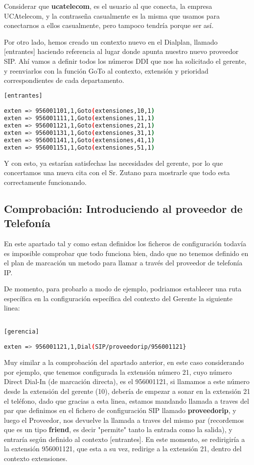 Considerar que \textbf{ucatelecom}, es el usuario al que conecta, la empresa UCAtelecom, y la contraseña casualmente es la misma que usamos para conectarnos a ellos casualmente, pero tampoco tendría porque ser así.

Por otro lado, hemos creado un contexto nuevo en el Dialplan, llamado [entrantes] haciendo referencia al lugar donde apunta nuestro nuevo proveedor SIP. Ahí vamos a definir todos los números DDI que nos ha solicitado el gerente, y reenviarlos con la función GoTo al contexto, extensión y prioridad correspondientes de cada departamento.

\begin{lstlisting}[language=bash,title={/etc/asterisk/extensions.conf}]
[entrantes]

exten => 956001101,1,Goto(extensiones,10,1)
exten => 956001111,1,Goto(extensiones,11,1)
exten => 956001121,1,Goto(extensiones,21,1)
exten => 956001131,1,Goto(extensiones,31,1)
exten => 956001141,1,Goto(extensiones,41,1)
exten => 956001151,1,Goto(extensiones,51,1)
\end{lstlisting}

Y con esto, ya estarían satisfechas las necesidades del gerente, por lo que concertamos una nueva cita con el Sr. Zutano para mostrarle que todo esta correctamente funcionando.

\subsection{Comprobación: Introduciendo al proveedor de Telefonía}

En este apartado tal y como estan definidos los ficheros de configuración todavía es imposible comprobar que todo funciona bien, dado que no tenemos definido en el plan de marcación un metodo para llamar a través del proveedor de telefonía IP. 

De momento, para probarlo a modo de ejemplo, podriamos establecer una ruta específica en la configuración específica del contexto del Gerente la siguiente linea:

\begin{lstlisting}[language=bash,title={/etc/asterisk/extensions.conf}]

[gerencia]

exten => 956001121,1,Dial(SIP/proveedorip/956001121}

\end{lstlisting}

Muy similar a la comprobación del apartado anterior, en este caso considerando por ejemplo, que tenemos configurada la extensión número 21, cuyo número Direct Dial-In (de marcación directa), es el 956001121, si llamamos a este número desde la extensión del gerente (10), debería de empezar a sonar en la extensión 21 el teléfono, dado que gracias a esta linea, estamos mandando llamada a traves del par que definimos en el fichero de configuración SIP llamado \textbf{proveedorip}, y luego el Proveedor, nos devuelve la llamada a traves del mismo par (recordemos que es un tipo \textbf{friend}, es decir "permite" tanto la entrada como la salida), y entraría según definido al contexto [entrantes]. En este momento, se redirigiría a la extensión 956001121, que esta a su vez, redirige a la extensión 21, dentro del contexto extensiones.